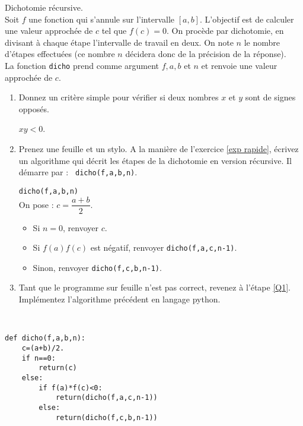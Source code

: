 \begin{exercice}Dichotomie récursive.\\
Soit $f$ une fonction qui s'annule sur l'intervalle $[a,b]$. L'objectif est de calculer une valeur approchée de $c$ tel que $f(c)=0$. On procède par dichotomie, en divisant à chaque étape l'intervalle de travail en deux. On note $n$ le nombre d'étapes effectuées (ce nombre $n$ décidera donc de la précision de la réponse).\\
La fonction \verb?dicho? prend comme argument $f,a,b$ et $n$ et renvoie une valeur approchée de $c$.
\begin{enumerate}
\item Donnez un critère simple pour vérifier si deux nombres $x$ et $y$ sont de signes opposés.
\begin{solution}
$xy<0$.
\end{solution}
\item \label{Q1} Prenez une feuille et un stylo. A la manière de l'exercice \ref{exp rapide}, écrivez un algorithme qui décrit les étapes de la dichotomie en version récursive. Il démarre par : \verb? dicho(f,a,b,n)?.
\begin{solution}
\verb?dicho(f,a,b,n)?\\
On pose : $c=\dfrac{a+b}{2}$.
\begin{itemize}
\item Si $n=0$, renvoyer $c$.
\item Si $f(a)f(c)$ est négatif, renvoyer \verb?dicho(f,a,c,n-1)?.
\item Sinon, renvoyer \verb?dicho(f,c,b,n-1)?.
\end{itemize}
\end{solution}
\item Tant que le programme sur feuille n'est pas correct, revenez à l'étape \ref{Q1}.  \\
Implémentez l'algorithme précédent en langage python.
\end{enumerate}
\end{exercice}
\begin{solution}~\\
\vspace{-0.7cm}
\begin{verbatim}
def dicho(f,a,b,n):
    c=(a+b)/2.
    if n==0:
        return(c)
    else:
        if f(a)*f(c)<0:
            return(dicho(f,a,c,n-1))
        else:
            return(dicho(f,c,b,n-1))
\end{verbatim}
\end{solution}






